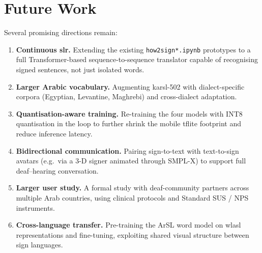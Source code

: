 \chapter{Future Work}
\label{ch:future}

Several promising directions remain:

\begin{enumerate}
  \item \textbf{Continuous \gls{slr}.} Extending the existing
        \texttt{how2sign*.ipynb} prototypes to a full Transformer-based
        sequence-to-sequence translator capable of recognising signed
        sentences, not just isolated words.
  \item \textbf{Larger Arabic vocabulary.} Augmenting \gls{karsl}-502
        with dialect-specific corpora (Egyptian, Levantine, Maghrebi) and
        cross-dialect adaptation.
  \item \textbf{Quantisation-aware training.} Re-training the four models
        with INT8 quantisation in the loop to further shrink the mobile
        \gls{tflite} footprint and reduce inference latency.
  \item \textbf{Bidirectional communication.} Pairing sign-to-text with
        text-to-sign avatars (e.g.\ via a 3-D signer animated through
        SMPL-X) to support full deaf--hearing conversation.
  \item \textbf{Larger user study.} A formal study with deaf-community
        partners across multiple Arab countries, using clinical
        protocols and Standard SUS / NPS instruments.
  \item \textbf{Cross-language transfer.} Pre-training the ArSL word
        model on \gls{wlasl} representations and fine-tuning, exploiting
        shared visual structure between sign languages.
\end{enumerate}
